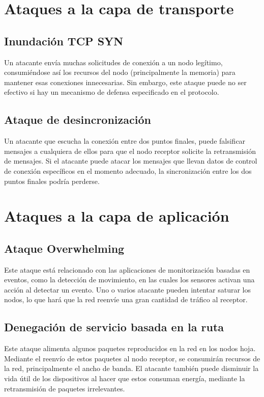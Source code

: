 \section{Ataques a la capa de transporte} %
\subsection{Inundación TCP SYN}
Un atacante envía muchas solicitudes de conexión a un nodo legítimo, consumiéndose así los recursos del nodo (principalmente la memoria) para mantener esas conexiones innecesarias. Sin embargo, este ataque puede no ser efectivo si hay un mecanismo de defensa especificado en el protocolo.
\subsection{Ataque de desincronización}
Un atacante que escucha la conexión entre dos puntos finales, puede falsificar mensajes a cualquiera de ellos para que el nodo receptor solicite la retransmisión de mensajes. Si el atacante puede atacar los mensajes que llevan datos de control de conexión específicos en el momento adecuado, la sincronización entre los dos puntos finales podría perderse.



\section{Ataques a la capa de aplicación} %
\subsection{Ataque Overwhelming}
Este ataque está relacionado con las aplicaciones de monitorización basadas en eventos, como la detección de movimiento, en las cuales los sensores activan una acción al detectar un evento. Uno o varios atacante pueden intentar saturar los nodos, lo que hará que la red reenvíe una gran cantidad de tráfico al receptor.
\subsection{Denegación de servicio basada en la ruta}
Este ataque alimenta algunos paquetes reproducidos en la red en los nodos hoja. Mediante el reenvío de estos paquetes al nodo receptor, se consumirán recursos de la red, principalmente el ancho de banda. El atacante también puede disminuir la vida útil de los dispositivos al hacer que estos consuman energía, mediante la retransmisión de paquetes irrelevantes.